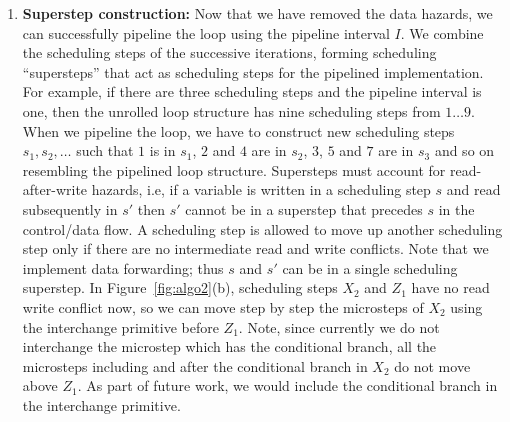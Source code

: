 \begin{enumerate}
\item {\bf Superstep construction:} Now that we have removed the data hazards, we can successfully pipeline the loop using the pipeline interval $I$. We combine the scheduling steps of the successive iterations, forming scheduling ``supersteps'' that act as scheduling steps for the pipelined
implementation. For example, if there are three scheduling steps and the pipeline interval is one, then the unrolled loop structure has nine scheduling steps from ${1 \ldots 9}$. When we pipeline the loop, we have to construct new scheduling steps ${s_1, s_2, \ldots}$ such that $1$ is in $s_1$, $2$ and $4$ are in $s_2$, $3$, $5$ and $7$ are in $s_3$ and so on resembling the pipelined loop structure.
Supersteps must account for read-after-write hazards, i.e, if a variable is written in a scheduling step $s$ and read subsequently in
$s'$ then $s'$ cannot be in a superstep that precedes $s$ in the control/data flow. A scheduling step is allowed to move up another scheduling step only if there are no intermediate read and write conflicts. Note that we implement data forwarding; thus $s$ and $s'$ can be in a single scheduling superstep. 
In Figure~\ref{fig:algo2}(b), scheduling steps $X_2$ and $Z_1$ have no read write conflict now, so we can move step by step the microsteps of $X_2$ using the interchange primitive before $Z_1$. Note, since currently we do not interchange the microstep which has the conditional branch, all the microsteps including and after the conditional branch in $X_2$ do not move above $Z_1$. As part of future work, we would include the conditional branch in the interchange primitive.



\end{enumerate}

